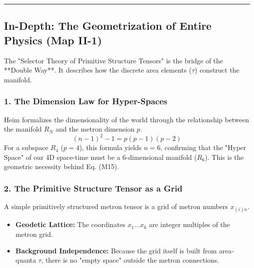 \documentclass[11pt,a4paper,oneside]{article}
\newcommand{\hr}{\par\vspace{2em}\noindent\rule{\linewidth}{0.4pt}\par\vspace{2em}}
\begin{document}
\hr

\subsection*{In-Depth: The Geometrization of Entire Physics (Map II-1)}

The "Selector Theory of Primitive Structure Tensors" is the bridge of the **Double Way**. It describes how the discrete area elements ($\tau$) construct the manifold.

\subsubsection*{1. The Dimension Law for Hyper-Spaces}
Heim formalizes the dimensionality of the world through the relationship between the manifold $R_N$ and the metron dimension $p$. 
\begin{equation}
    (n-1)^2 - 1 = p(p-1)(p-2) \tag{Dimensional Law}
\end{equation}
For a subspace $R_4$ ($p=4$), this formula yields $n=6$, confirming that the "Hyper Space" of our 4D space-time must be a 6-dimensional manifold ($R_6$). This is the geometric necessity behind Eq. (M15).

\subsubsection*{2. The Primitive Structure Tensor as a Grid}
A simple primitively structured metron tensor is a grid of metron numbers $x_{(i)n}$. 
\begin{itemize}
    \item \textbf{Geodetic Lattice:} The coordinates $x_1 \dots x_6$ are integer multiples of the metron grid.
    \item \textbf{Background Independence:} Because the grid itself is built from area-quanta $\tau$, there is no "empty space" outside the metron connections. 
\end{itemize}
\end{document}
